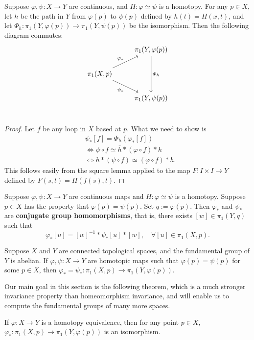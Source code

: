 \begin{lemma}\label{homotopic map incude}
Suppose $\varphi,\psi:X\to Y$ are continuous, and $H:\varphi\simeq\psi$ is a homotopy. For any $p\in X$, let $h$ be the path in $Y$ from $\varphi(p)$ to $\psi(p)$ defined by $h(t)=H(x,t)$, and let $\varPhi_h:\pi_1(Y,\varphi(p))\to\pi_1(Y,\psi(p))$ be the isomorphism. Then the following diagram commutes:
\[\begin{tikzcd}
&\pi_1(Y,\varphi(p))\ar[dd,"\varPhi_h"]\\
\pi_1(X,p)\ar[ru,"\varphi_*"]\ar[rd,swap,"\psi_*"]&\\
&\pi_1(Y,\psi(p))\\
\end{tikzcd}\]
\end{lemma}
\begin{proof}
Let $f$ be any loop in $X$ based at $p$. What we need to show is
\begin{align*}
&\psi_*[f]=\varPhi_h(\varphi_*[f])\\
&\iff\psi\circ f\simeq\bar{h}\ast(\varphi\circ f)\ast h\\
&\iff h\ast(\psi\circ f)\simeq (\varphi\circ f)\ast h.
\end{align*}
This follows easily from the square lemma applied to the map $F:I\times I\to Y$ defined by $F(s,t)=H(f(s),t)$.
\end{proof}
\begin{corollary}
Suppose $\varphi,\psi: X\to Y$ are continuous maps and $H:\varphi\simeq\psi$ is a homotopy. Suppose $p\in X$ has the property that $\varphi(p)=\psi(p)$. Set $q:=\varphi(p)$. Then $\varphi_*$ and $\psi_*$ are \textbf{conjugate group homomorphisms}, that is, there exists $[w]\in\pi_1(Y,q)$ such that
\[\varphi_*[u]=[w]^{-1}\ast \psi_*[u]\ast[w],\quad \forall[u]\in\pi_1(X,p).\]
\end{corollary}
\begin{corollary}
Suppose $X$ and $Y$ are connected topological spaces, and the fundamental group of $Y$ is abelian. If $\varphi,\psi:X\to Y$ are homotopic maps such that $\varphi(p)=\psi(p)$ for some $p\in X$, then $\varphi_*=\psi_*:\pi_1(X,p)\to\pi_1(Y,\varphi(p))$.
\end{corollary}
Our main goal in this section is the following theorem, which is a much stronger invariance property than homeomorphism invariance, and will enable us to compute the fundamental groups of many more spaces.
\begin{theorem}\label{homotopy Inva of pi_1}
If $\varphi:X\to Y$ is a homotopy equivalence, then for any point $p\in X$, $\varphi_*:\pi_1(X,p)\to\pi_1(Y,\varphi(p))$ is an isomorphism.
\end{theorem}
